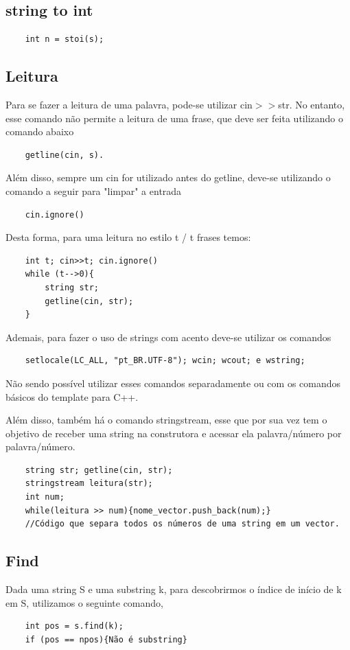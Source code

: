 \subsection{string to int}
\begin{verbatim}
    int n = stoi(s);
\end{verbatim}


\subsection{Leitura}
Para se fazer a leitura de uma palavra, pode-se utilizar cin$>>$str. No entanto, 
esse comando não permite a leitura de uma frase, que deve ser feita utilizando 
o comando abaixo
\begin{verbatim}
    getline(cin, s).
\end{verbatim}
Além disso, sempre um cin for utilizado antes do getline, deve-se utilizando o comando
a seguir para "limpar" a entrada
\begin{verbatim}
    cin.ignore()
\end{verbatim}
Desta forma, para uma leitura no estilo t / t frases temos:
\begin{verbatim}
    int t; cin>>t; cin.ignore()
    while (t-->0){
        string str;
        getline(cin, str);
    }
\end{verbatim}
Ademais, para fazer o uso de strings com acento deve-se utilizar os comandos
\begin{verbatim}
    setlocale(LC_ALL, "pt_BR.UTF-8"); wcin; wcout; e wstring;
\end{verbatim}
Não sendo possível utilizar esses comandos separadamente ou com os comandos
básicos do template para C++.

Além disso, também há o comando stringstream, esse que por sua vez tem o objetivo de
receber uma string na construtora e acessar ela palavra/número por palavra/número.
\begin{verbatim}
    string str; getline(cin, str);
    stringstream leitura(str);
    int num;
    while(leitura >> num){nome_vector.push_back(num);}
    //Código que separa todos os números de uma string em um vector.
\end{verbatim}

\subsection{Find}
Dada uma string S e uma substring k, para descobrirmos o índice de início de k em S, 
utilizamos o seguinte comando,
\begin{verbatim}
    int pos = s.find(k);
    if (pos == npos){Não é substring}
\end{verbatim}

